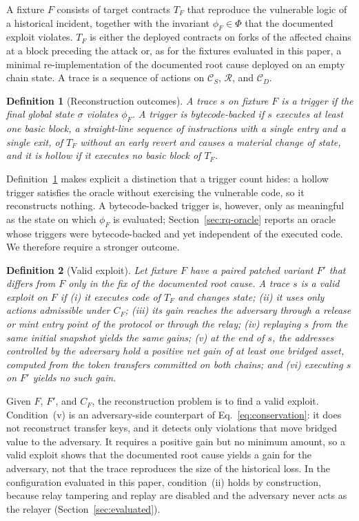 \documentclass[a4paper]{cas-sc}
\newtheorem{definition}{Definition}
\begin{document}
A fixture $F$ consists of target contracts $T_F$ that reproduce the vulnerable logic of a historical incident, together with the invariant $\phi_F \in \Phi$ that the documented exploit violates. $T_F$ is either the deployed contracts on forks of the affected chains at a block preceding the attack or, as for the fixtures evaluated in this paper, a minimal re-implementation of the documented root cause deployed on an empty chain state. A trace is a sequence of actions on $\mathcal{C}_S$, $\mathcal{R}$, and $\mathcal{C}_D$.

\begin{definition}[Reconstruction outcomes]\label{def:outcomes}
A trace $s$ on fixture $F$ is a trigger if the final global state $\sigma$ violates $\phi_F$. A trigger is bytecode-backed if $s$ executes at least one basic block, a straight-line sequence of instructions with a single entry and a single exit, of $T_F$ without an early revert and causes a material change of state, and it is hollow if it executes no basic block of $T_F$.
\end{definition}

Definition~\ref{def:outcomes} makes explicit a distinction that a trigger count hides: a hollow trigger satisfies the oracle without exercising the vulnerable code, so it reconstructs nothing. A bytecode-backed trigger is, however, only as meaningful as the state on which $\phi_F$ is evaluated; Section~\ref{sec:rq-oracle} reports an oracle whose triggers were bytecode-backed and yet independent of the executed code. We therefore require a stronger outcome.

\begin{definition}[Valid exploit]\label{def:valid}
Let fixture $F$ have a paired patched variant $F'$ that differs from $F$ only in the fix of the documented root cause. A trace $s$ is a valid exploit on $F$ if (i) it executes code of $T_F$ and changes state; (ii) it uses only actions admissible under $C_F$; (iii) its gain reaches the adversary through a release or mint entry point of the protocol or through the relay; (iv) replaying $s$ from the same initial snapshot yields the same gains; (v) at the end of $s$, the addresses controlled by the adversary hold a positive net gain of at least one bridged asset, computed from the token transfers committed on both chains; and (vi) executing $s$ on $F'$ yields no such gain.
\end{definition}

Given $F$, $F'$, and $C_F$, the reconstruction problem is to find a valid exploit. Condition~(v) is an adversary-side counterpart of Eq.~\eqref{eq:conservation}: it does not reconstruct transfer keys, and it detects only violations that move bridged value to the adversary. It requires a positive gain but no minimum amount, so a valid exploit shows that the documented root cause yields a gain for the adversary, not that the trace reproduces the size of the historical loss. In the configuration evaluated in this paper, condition~(ii) holds by construction, because relay tampering and replay are disabled and the adversary never acts as the relayer (Section~\ref{sec:evaluated}).
\end{document}
